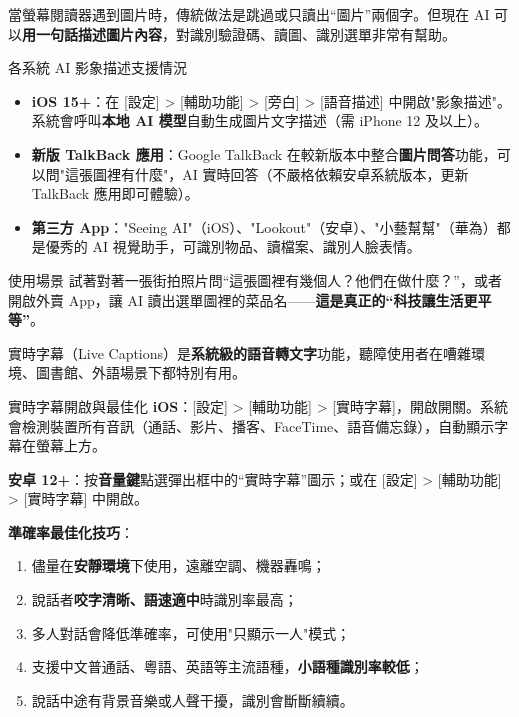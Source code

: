 
當螢幕閱讀器遇到圖片時，傳統做法是跳過或只讀出“圖片”兩個字。但現在 AI 可以\textbf{用一句話描述圖片內容}，對識別驗證碼、讀圖、識別選單非常有幫助。

\begin{tcbinfo}{各系統 AI 影象描述支援情況}
\begin{itemize}
  \item \textbf{iOS 15+}：在 [設定] > [輔助功能] > [旁白] > [語音描述] 中開啟"影象描述"。系統會呼叫\textbf{本地 AI 模型}自動生成圖片文字描述（需 iPhone 12 及以上）。
  \item \textbf{新版 TalkBack 應用}：Google TalkBack 在較新版本中整合\textbf{圖片問答}功能，可以問"這張圖裡有什麼"，AI 實時回答（不嚴格依賴安卓系統版本，更新 TalkBack 應用即可體驗）。
  \item \textbf{第三方 App}："Seeing AI"（iOS）、"Lookout"（安卓）、"小藝幫幫"（華為）都是優秀的 AI 視覺助手，可識別物品、讀檔案、識別人臉表情。
\end{itemize}

\end{tcbinfo}

\begin{tcbpractice}{使用場景}
試著對著一張街拍照片問“這張圖裡有幾個人？他們在做什麼？”，或者開啟外賣 App，讓 AI 讀出選單圖裡的菜品名——\textbf{這是真正的“科技讓生活更平等”}。

\end{tcbpractice}


實時字幕（Live Captions）是\textbf{系統級的語音轉文字}功能，聽障使用者在嘈雜環境、圖書館、外語場景下都特別有用。

\begin{tcbinfo}{實時字幕開啟與最佳化}
\textbf{iOS}：[設定] > [輔助功能] > [實時字幕]，開啟開關。系統會檢測裝置所有音訊（通話、影片、播客、FaceTime、語音備忘錄），自動顯示字幕在螢幕上方。

\textbf{安卓 12+}：按\textbf{音量鍵}點選彈出框中的“實時字幕”圖示；或在 [設定] > [輔助功能] > [實時字幕] 中開啟。

\textbf{準確率最佳化技巧}：

\begin{enumerate}
  \item 儘量在\textbf{安靜環境}下使用，遠離空調、機器轟鳴；
  \item 說話者\textbf{咬字清晰、語速適中}時識別率最高；
  \item 多人對話會降低準確率，可使用"只顯示一人"模式；
  \item 支援中文普通話、粵語、英語等主流語種，\textbf{小語種識別率較低}；
  \item 說話中途有背景音樂或人聲干擾，識別會斷斷續續。
\end{enumerate}

\end{tcbinfo}

